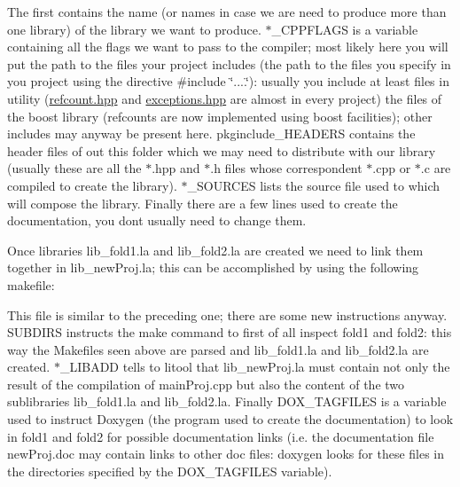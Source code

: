 The first contains the name (or names in case we are need to produce more than one library) of the library we want to produce. $\ast$\+\_\+\+C\+P\+P\+F\+L\+A\+GS is a variable containing all the flags we want to pass to the compiler; most likely here you will put the path to the files your project includes (the path to the files you specify in you project using the directive \#include \char`\"{}....\char`\"{})\+: usually you include at least files in utility (\hyperlink{refcount_8hpp}{refcount.\+hpp} and \hyperlink{exceptions_8hpp}{exceptions.\+hpp} are almost in every project) the files of the boost library (refcounts are now implemented using boost facilities); other includes may anyway be present here. pkginclude\+\_\+\+H\+E\+A\+D\+E\+RS contains the header files of out this folder which we may need to distribute with our library (usually these are all the $\ast$.hpp and $\ast$.h files whose correspondent $\ast$.cpp or $\ast$.c are compiled to create the library). $\ast$\+\_\+\+S\+O\+U\+R\+C\+ES lists the source file used to which will compose the library. Finally there are a few lines used to create the documentation, you don\textquotesingle{}t usually need to change them.

Once libraries lib\+\_\+fold1.\+la and lib\+\_\+fold2.\+la are created we need to link them together in lib\+\_\+new\+Proj.\+la; this can be accomplished by using the following makefile\+: 


This file is similar to the preceding one; there are some new instructions anyway. S\+U\+B\+D\+I\+RS instructs the make command to first of all inspect fold1 and fold2\+: this way the Makefiles seen above are parsed and lib\+\_\+fold1.\+la and lib\+\_\+fold2.\+la are created. $\ast$\+\_\+\+L\+I\+B\+A\+DD tells to litool that lib\+\_\+new\+Proj.\+la must contain not only the result of the compilation of main\+Proj.\+cpp but also the content of the two sublibraries lib\+\_\+fold1.\+la and lib\+\_\+fold2.\+la. Finally D\+O\+X\+\_\+\+T\+A\+G\+F\+I\+L\+ES is a variable used to instruct Doxygen (the program used to create the documentation) to look in fold1 and fold2 for possible documentation links (i.\+e. the documentation file new\+Proj.\+doc may contain links to other doc files\+: doxygen looks for these files in the directories specified by the D\+O\+X\+\_\+\+T\+A\+G\+F\+I\+L\+ES variable).

